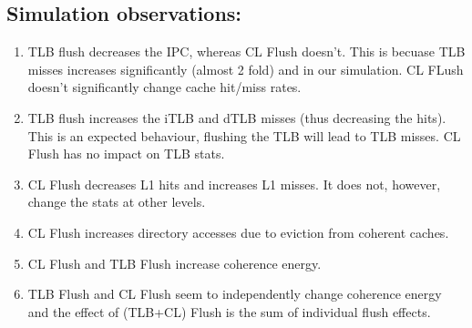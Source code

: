 \documentclass[11pt]{article}
\begin{document}
\subsection{Simulation observations:}
\begin{enumerate}
    \item TLB flush decreases the IPC, whereas CL Flush doesn't. This is becuase TLB misses increases significantly (almost 2 fold) and in our simulation. CL FLush doesn't significantly change cache hit/miss rates.
    \item TLB flush increases the iTLB and dTLB misses (thus decreasing the hits). This is an expected behaviour, flushing the TLB will lead to TLB misses. CL Flush has no impact on TLB stats.
    \item CL Flush decreases L1 hits and increases L1 misses. It does not, however, change the stats at other levels.
    \item CL Flush increases directory accesses due to eviction from coherent caches.
    \item CL Flush and TLB Flush increase coherence energy.
    \item TLB Flush and CL Flush seem to independently change coherence energy and the effect of (TLB+CL) Flush is the sum of individual flush effects.
\end{enumerate}
\end{document}
